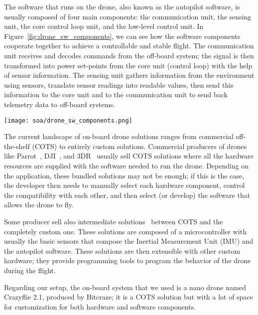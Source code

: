 The software that runs on the drone, also known as the autopilot software, is usually composed of four main components: the communication unit, the sensing unit, the core control loop unit, and the low-level control unit. 
In Figure~\ref{fig:drone_sw_components}, we can see how the software components cooperate together to achieve a controllable and stable flight.
The communication unit receives and decodes commands from the off-board system; the signal is then transformed into power set-points from the core unit (control loop) with the help of sensor information. 
The sensing unit gathers information from the environment using sensors, translate 
sensor readings into readable values, then send this information to the core unit and to the communication unit to send back telemetry data to off-board systems.

\begin{SCfigure}[\sidecaptionrelwidth][h]
    \texttt{[image: soa/drone\_sw\_components.png]}
    \caption[Drone software components]{
        The main software components of a drone are: 
        the \textit{sensing unit}, the \textit{communication unit} and the \textit{core unit (control loop)}.
    }\label{fig:drone_sw_components}
\end{SCfigure}

The current landscape of on-board drone solutions ranges from commercial off-the-shelf (COTS) to entirely custom solutions.
Commercial producers of drones like Parrot~\cite{parrot}, DJI~\cite{dij}, and 3DR~\cite{3DR} usually sell COTS solutions where all the hardware resources are supplied
with the software needed to run the drone.
Depending on the application, these bundled solutions may not be enough; if this is the case, 
the developer then needs to manually select each hardware component, control the compatibility with each other, 
and then select (or develop) the software that allows the drone to fly.

Some producer sell also intermediate solutions~\cite{pixhawk, px4, cube, navio2} between COTS and the completely custom one.
These solutions are composed of a microcontroller with usually the basic sensors that compose the 
Inertial Measurement Unit (IMU) and the autopilot software. 
These solutions are then extensible with other custom hardware; they provide programming tools to program the 
behavior of the drone during the flight.

Regarding our setup, the on-board system that we used is a nano drone named Crazyflie 2.1, produced by Bitcraze; 
it is a COTS solution but with a lot of space for customization for both hardware and software components.

